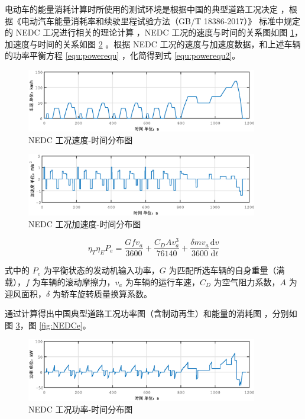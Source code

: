 电动车的能量消耗计算时所使用的测试环境是根据中国的典型道路工况决定 \cite{刘希玲2000我国城市汽车行驶工况调查研究}，根据《电动汽车能量消耗率和续驶里程试验方法（GB/T 18386-2017）》 标准中规定的 NEDC 工况进行相关的理论计算 \cite{叶磊2012基于中国典型城市循环工况的动力电池测试评价方法}，NEDC 工况的速度与时间的关系图如图 \ref{fig:NEDCv}，加速度与时间的关系如图 \ref{fig:NEDCa} \cite{kim2009model}。根据 NEDC 工况的速度与加速度数据，和上述车辆的功率平衡方程 \ref{equ:powerequ} ，化简得到式 \ref{equ:powerequ2}。

\begin{figure}
	\centering
	\includegraphics[width=0.9\textwidth]{figures/NEDCv.eps}
	\caption{NEDC 工况速度-时间分布图}\label{fig:NEDCv}
\end{figure}

\begin{figure}
	\centering
	\includegraphics[width=0.9\textwidth]{figures/NEDCa.eps}
	\caption{NEDC 工况加速度-时间分布图}\label{fig:NEDCa}
\end{figure}

\begin{equation}
	\label{equ:powerequ2}
	\eta_T\eta_EP_e=\frac{Gfv_a}{3600}+\frac{C_DAv_a^3}{76140}+\frac{\delta mv_a}{3600}\frac{\mathrm{d}v}{\mathrm{d}t}
\end{equation}

式中的 $P_e$ 为平衡状态的发动机输入功率，$G$ 为匹配所选车辆的自身重量（满载），$f$ 为车辆的滚动摩擦力，$v_a$ 为车辆的运行车速，$C_D$ 为空气阻力系数，$A$ 为迎风面积，$\delta$ 为轿车旋转质量换算系数。

通过计算得出中国典型道路工况功率图（含制动再生）和能量的消耗图 \cite{高建平2015插电式混合动力汽车车载复合电源功率分配策略研究}，分别如图 \ref{fig:NEDCp}，图 \ref{fig:NEDCe}。
\begin{figure}
 \centering
 \includegraphics[width=0.9\textwidth]{figures/NEDCp.eps}
 \caption{NEDC 工况功率-时间分布图}\label{fig:NEDCp}
\end{figure}

